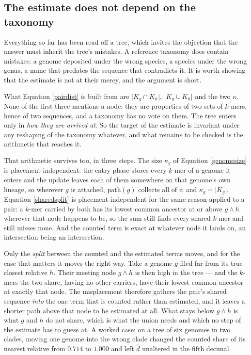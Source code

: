 \documentclass[pdflatex,sn-vancouver-num]{sn-jnl}
\begin{document}
\subsection{The estimate does not depend on the taxonomy}\label{taxindep}

Everything so far has been read off a tree, which invites the objection that the answer must inherit
the tree's mistakes. A reference taxonomy does contain mistakes: a genome deposited under the wrong
species, a species under the wrong genus, a name that predates the sequence that contradicts it. It
is worth showing that the estimate is not at their mercy, and the argument is short.

What Equation \eqref{pairdist} is built from are $\lvert K_g \cap K_h \rvert$, $\lvert K_g \cup K_h
\rvert$ and the two $\kappa$. None of the first three mentions a node: they are properties of two
sets of $k$-mers, hence of two sequences, and a taxonomy has no vote on them. The tree enters only in
\emph{how they are arrived at}. So the target of the estimate is invariant under any reshaping of the
taxonomy whatever, and what remains to be checked is the arithmetic that reaches it.

That arithmetic survives too, in three steps. The size $\kappa_g$ of Equation \eqref{genomesize} is
placement-independent: the entry phase stores every $k$-mer of a genome it enters and the update
leaves each of them somewhere on that genome's own lineage, so wherever $g$ is attached,
$\mathrm{path}(g)$ collects all of it and $\kappa_g = \lvert K_g \rvert$. Equation
\eqref{sharedsplit} is placement-independent for the same reason applied to a pair: a $k$-mer carried
by both has its lowest common ancestor at or above $g \wedge h$ wherever that node happens to be, so
the sum still finds every shared $k$-mer and still misses none. And the counted term is exact at
whatever node it lands on, an intersection being an intersection.

Only the \emph{split} between the counted and the estimated terms moves, and for the case that
matters it moves the right way. Take a genome $g$ filed far from its true closest relative $h$. Their
meeting node $g \wedge h$ is then high in the tree --- and the $k$-mers the two share, having no other
carriers, have their lowest common ancestor at exactly that node. The misplacement therefore gathers
the pair's shared sequence \emph{into} the one term that is counted rather than estimated, and it
leaves a shorter path above that node to be estimated at all. What stays below $g \wedge h$ is what
$g$ and $h$ do not share, which is what the union needs and which no step of the estimate has to
guess at. A worked case: on a tree of six genomes in two clades, moving one genome into the wrong
clade changed the counted share of its nearest relative from $0.714$ to $1.000$ and left
$\widehat{d}$ unaltered in the fifth decimal.
\end{document}
